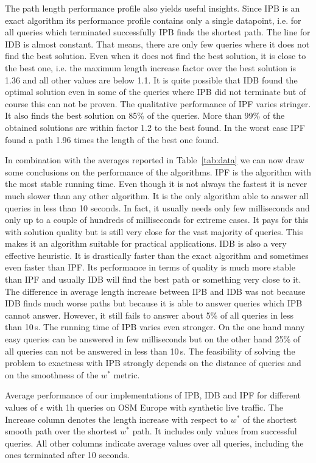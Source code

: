 \documentclass[a4paper,UKenglish,cleveref, autoref, thm-restate]{lipics-v2021}
\begin{document}
The path length performance profile also yields useful insights.
Since IPB is an exact algorithm its performance profile contains only a single datapoint, i.e. for all queries which terminated successfully IPB finds the shortest path.
The line for IDB is almost constant.
That means, there are only few queries where it does not find the best solution.
Even when it does not find the best solution, it is close to the best one, i.e. the maximum length increase factor over the best solution is 1.36 and all other values are below 1.1.
It is quite possible that IDB found the optimal solution even in some of the queries where IPB did not terminate but of course this can not be proven.
The qualitative performance of IPF varies stringer.
It also finds the best solution on 85\% of the queries.
More than 99\% of the obtained solutions are within factor 1.2 to the best found.
In the worst case IPF found a path 1.96 times the length of the best one found.

In combination with the averages reported in Table~\ref{tab:data} we can now draw some conclusions on the performance of the algorithms.
IPF is the algorithm with the most stable running time.
Even though it is not always the fastest it is never much slower than any other algorithm.
It is the only algorithm able to answer all queries in less than 10 seconds.
In fact, it usually needs only few milliseconds and only up to a couple of hundreds of milliseconds for extreme cases.
It pays for this  with solution quality but is still very close for the vast majority of queries.
This makes it an algorithm suitable for practical applications.
IDB is also a very effective heuristic.
It is drastically faster than the exact algorithm and sometimes even faster than IPF.
Its performance in terms of quality is much more stable than IPF and usually IDB will find the best path or something very close to it.
The difference in average length increase between IPB and IDB was not because IDB finds much worse paths but because it is able to answer queries which IPB cannot answer.
However, it still fails to answer about 5\% of all queries in less than 10\,s.
The running time of IPB varies even stronger.
On the one hand many easy queries can be answered in few milliseconds but on the other hand 25\% of all queries can not be answered in less than 10\,s.
The feasibility of solving the problem to exactness with IPB strongly depends on the distance of queries and on the smoothness of the $w^*$ metric.

\begin{table}
\centering
\caption{
Average performance of our implementations of IPB, IDB and IPF for different values of $\epsilon$ with 1h queries on OSM Europe with synthetic live traffic.
The Increase column denotes the length increase with respect to $w^*$ of the shortest smooth path over the shortest $w^*$ path.
It includes only values from successful queries.
All other columns indicate average values over all queries, including the ones terminated after 10 seconds.
}\label{tab:epsilon}

\end{table}
\end{document}
